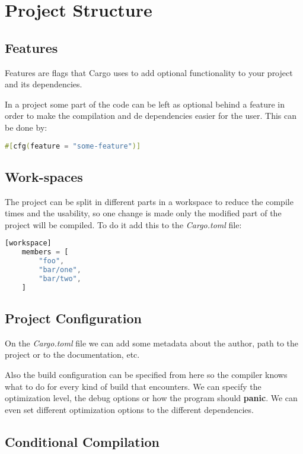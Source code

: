 \section{Project Structure}

\subsection{Features}

Features are flags that Cargo uses to add optional functionality to your project and its dependencies.

In a project some part of the code can be left as optional behind a feature in order to make the compilation and de dependencies easier for the user.
This can be done by:

\begin{lstlisting}[language=Rust, style=boxed]
    #[cfg(feature = "some-feature")]
\end{lstlisting}

\subsection{Work-spaces}

The project can be split in different parts in a workspace to reduce the compile times and the usability,
so one change is made only the modified part of the project will be compiled.
To do it add this to the \textit{Cargo.toml} file:

\begin{lstlisting}[language=Rust, style=boxed]
    [workspace]
    members = [
    	"foo",
    	"bar/one",
    	"bar/two",
    ]   
\end{lstlisting}


\subsection{Project Configuration}

On the \textit{Cargo.toml} file we can add some metadata about the author, path to the project or to the documentation, etc.

Also the build configuration can be specified from here so the compiler knows what to do for every kind of build that encounters.
We can specify the optimization level, the debug options or how the program should \textbf{panic}.
We can even set different optimization options to the different dependencies.

\subsection{Conditional Compilation}

